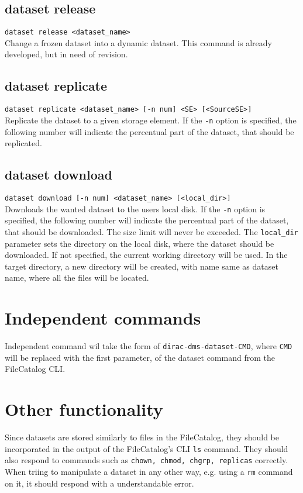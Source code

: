 \documentclass{scrreprt}
\begin{document}
\subsection{dataset release}
\texttt{dataset release <dataset_name>} \\
Change a frozen dataset into a dynamic dataset. This command is already developed, but in need of revision.  

\subsection{dataset replicate}
\texttt{dataset replicate <dataset_name> [-n num] <SE> [<SourceSE>]} \\
Replicate the dataset to a given storage element. If the \texttt{-n} option is specified, the following number will indicate the percentual part of the dataset, that should be replicated.

\subsection{dataset download}
\texttt{dataset download [-n num] <dataset_name> [<local_dir>]} \\
Downloads the wanted dataset to the users local disk. If the \texttt{-n} option is specified, the following number will indicate the percentual part of the dataset, that should be downloaded. The size limit will never be exceeded. The \texttt{local_dir} parameter sets the directory on the local disk, where the dataset should be downloaded. If not specified, the current working directory will be used. In the target directory, a new directory will be created, with name same as dataset name, where all the files will be located.


\section{Independent commands}
Independent command wil take the form of \texttt{dirac-dms-dataset-CMD}, where \texttt{CMD} will be replaced with the first parameter, of the dataset command from the FileCatalog CLI. 


\section{Other functionality} \label{sec:OtherFunc}
Since datasets are stored similarly to files in the FileCatalog, they should be incorporated in the output of the FileCatalog's CLI \texttt{ls} command. They should also respond to commands such as \texttt{chown, chmod, chgrp, replicas} correctly. When triing to manipulate a dataset in any other way, e.g. using a \texttt{rm} command on it, it should respond with a understandable error.
\end{document}
